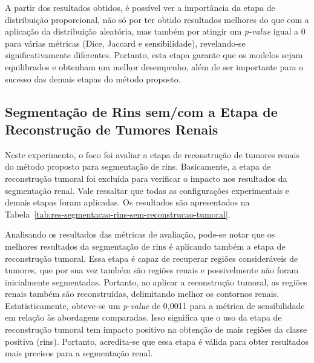A partir dos resultados obtidos, é possível ver a importância da etapa de distribuição proporcional, não só por ter obtido resultados melhores do que com a aplicação da distribuição aleatória, mas também por atingir um \textit{p-value} igual a 0 para várias métricas (Dice, Jaccard e sensibilidade), revelando-se significativamente diferentes. Portanto, esta etapa garante que os modelos sejam equilibrados e obtenham um melhor desempenho, além de ser importante para o sucesso das demais etapas do método proposto.

\subsection{Segmentação de Rins sem/com a Etapa de Reconstrução de Tumores Renais}
\label{sec:segmentacao-rins-sem-reconstrucao-tumoral}

Neste experimento, o foco foi avaliar a etapa de reconstrução de tumores renais do método proposto para segmentação de rins. Basicamente, a etapa de reconstrução tumoral foi excluída para verificar o impacto nos resultados da segmentação renal. Vale ressaltar que todas as configurações experimentais e demais etapas foram aplicadas. Os resultados são apresentados na Tabela~\ref{tab:res-segmentacao-rins-sem-reconstrucao-tumoral}.

\begin{table}[!ht]
\caption{Resultados da segmentação de rins com e sem a etapa de reconstrução tumoral.}
\label{tab:res-segmentacao-rins-sem-reconstrucao-tumoral}
\centering
\onehalfspacing
{}
\end{table}

Analisando os resultados das métricas de avaliação, pode-se notar que os melhores resultados da segmentação de rins é aplicando também a etapa de reconstrução tumoral. Essa etapa é capaz de recuperar regiões consideráveis de tumores, que por sua vez também são regiões renais e possivelmente não foram inicialmente segmentadas. Portanto, ao aplicar a reconstrução tumoral, as regiões renais também são reconstruídas, delimitando melhor os contornos renais. Estatisticamente, obteve-se um \textit{p-value} de 0,0011 para a métrica de sensibilidade em relação às abordagens comparadas. Isso significa que o uso da etapa de reconstrução tumoral tem impacto positivo na obtenção de mais regiões da classe positiva (rins). Portanto, acredita-se que essa etapa é válida para obter resultados mais precisos para a segmentação renal.

